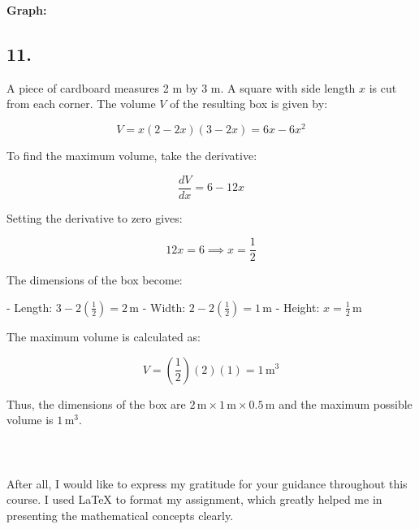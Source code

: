 \documentclass[a4paper, 7pt]{article}
\begin{document}
\textbf{Graph:}
\begin{center}
\end{center}

\subsection*{11.}
A piece of cardboard measures 2 m by 3 m. A square with side length \( x \) is cut from each corner. The volume \( V \) of the resulting box is given by:

\[
V = x(2 - 2x)(3 - 2x) = 6x - 6x^2
\]

To find the maximum volume, take the derivative:

\[
\frac{dV}{dx} = 6 - 12x
\]

Setting the derivative to zero gives:

\[
12x = 6 \implies x = \frac{1}{2}
\]

The dimensions of the box become:

- Length: \( 3 - 2\left(\frac{1}{2}\right) = 2 \, \text{m} \)
- Width: \( 2 - 2\left(\frac{1}{2}\right) = 1 \, \text{m} \)
- Height: \( x = \frac{1}{2} \, \text{m} \)

The maximum volume is calculated as:

\[
V = \left(\frac{1}{2}\right)(2)(1) = 1 \, \text{m}^3
\]

Thus, the dimensions of the box are \( 2 \, \text{m} \times 1 \, \text{m} \times 0.5 \, \text{m} \) and the maximum possible volume is \( 1 \, \text{m}^3 \).\\ \\

\section*{}
After all, I would like to express my gratitude for your guidance throughout this course.
I used LaTeX to format my assignment, which greatly helped me in presenting the mathematical concepts clearly.
\end{document}

